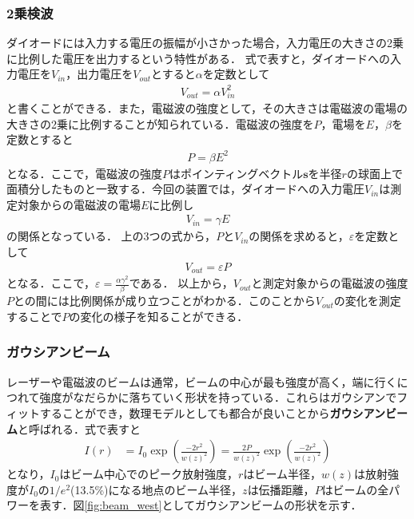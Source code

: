 \documentclass[a4j,10pt,oneside,openany]{jsbook}
\newcommand{\vs}{\boldsymbol{s}}
\begin{document}
{\subsubsection{2乗検波}
ダイオードには入力する電圧の振幅が小さかった場合，入力電圧の大きさの2乗に比例した電圧を出力するという特性がある．
式で表すと，ダイオードへの入力電圧を$V_{in}$，出力電圧を$V_{out}$とすると$\alpha$を定数として
\begin{align}
  V_{out} = \alpha V_{in}^2
\end{align}
と書くことができる．また，電磁波の強度として，その大きさは電磁波の電場の大きさの2乗に比例することが知られている．電磁波の強度を$P$，電場を$E$，$\beta$を定数とすると
\begin{align}
  P = \beta E^2
\end{align}
となる．ここで，電磁波の強度$P$はポインティングベクトル$\vs$を半径$r$の球面上で面積分したものと一致する．今回の装置では，ダイオードへの入力電圧$V_{in}$は測定対象からの電磁波の電場$E$に比例し
\begin{align}
  V_{in}=\gamma E
\end{align}
の関係となっている．
上の3つの式から，$P$と$V_{in}$の関係を求めると，$\varepsilon$を定数として
\begin{align}
  V_{out}=\varepsilon P
\end{align}
となる．ここで，$\varepsilon=\frac{\alpha \gamma^2}{\beta}$である．
以上から，$V_{out}$と測定対象からの電磁波の強度$P$との間には比例関係が成り立つことがわかる．このことから$V_{out}$の変化を測定することで$P$の変化の様子を知ることができる．

\subsubsection{ガウシアンビーム}
レーザーや電磁波のビームは通常，ビームの中心が最も強度が高く，端に行くにつれて強度がなだらかに落ちていく形状を持っている．これらはガウシアンでフィットすることができ，数理モデルとしても都合が良いことから\textbf{ガウシアンビーム}と呼ばれる．式で表すと
\begin{align}
  I(r) &= I_0 \exp\left( \frac{-2r^2}{w(z)^2}\right)=\frac{2P}{w(z)^2}\exp\left(\frac{-2r^2}{w(z)^2}\right)
\end{align}
となり，$I_0$はビーム中心でのピーク放射強度，$r$はビーム半径，$w(z)$は放射強度が$I_0$の$1/e^2$(13.5\%)になる地点のビーム半径，$z$は伝播距離，$P$はビームの全パワーを表す．図\ref{fig:beam_west}としてガウシアンビームの形状を示す．

}
\end{document}

